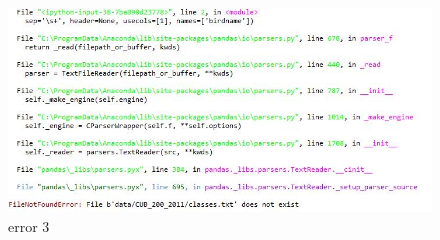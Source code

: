 \begin{enumerate}
\begin{enumerate}
\begin{itemize}
\begin{figure}[ht]
\centering
\includegraphics[scale=0.2]{figures/errorfadila3.jpg}
\caption{error 3}
\label{contoh}
\end{figure}

\end{itemize}
\end{enumerate}
\end{enumerate}